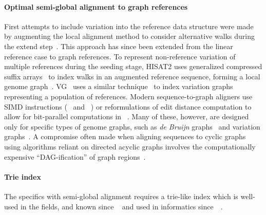\paragraph{Optimal semi-global alignment to graph references}
First attempts to include variation into the reference data structure were made
by augmenting the local alignment method to consider alternative walks during
the extend step~\cite{schneeberger_simultaneous_2009,palmapper}. This approach
has since been extended from the linear reference case to graph references. To
represent non-reference variation of multiple references during the seeding
stage, HISAT2 uses generalized compressed suffix
arrays~\cite{siren_indexing_2014} to index walks in an augmented reference
sequence, forming a local genome graph~\cite{kim_graphbased_2019}.
VG~\cite{garrison_variation_2018} uses a similar
technique~\cite{siren_indexing_2017} to index variation graphs representing a
population of references. Modern sequence-to-graph aligners use SIMD
instructions (\vg~\cite{garrison_variation_2018} and
\pasgal~\cite{jain_accelerating_2019}) or reformulations of edit distance
computation to allow for bit-parallel computations in
\graphaligner~\cite{rautiainen_bitparallel_2019}. Many of these, however, are
designed only for specific types of genome graphs, such as {\itshape de Bruijn}
graphs~\cite{liu_debga_2016,limasset2019toward} and variation
graphs~\cite{garrison_variation_2018}. A compromise often made when aligning
sequences to cyclic graphs using algorithms reliant on directed acyclic graphs
involves the computationally expensive ``DAG-ification'' of graph
regions~\cite{kavya_sequence_2019,garrison_variation_2018}.

\paragraph{Trie index}
The specifics with semi-global alignment requires a trie-like index which is
well-used in the fields, and known since
\citeyear{thue1912gegenseitige}~\cite{thue1912gegenseitige} and used in
informatics since~\citeyear{de1959file}~\cite{de1959file}.